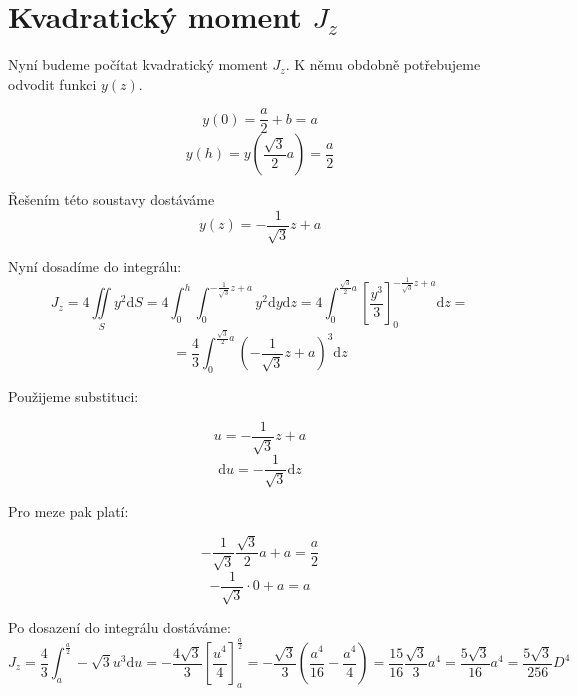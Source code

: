 \documentclass{article}
\begin{document}
\section{Kvadratický moment $J_z$}
Nyní budeme počítat kvadratický moment $J_z$. K němu obdobně potřebujeme odvodit funkci $y(z)$.

\[ y(0)=\frac{a}{2}+b = a\] 
\[ y(h)=y\left(\frac{\sqrt{3}}{2}a\right)=\frac{a}{2}\]

Řešením této soustavy dostáváme
\[ y(z)=-\frac{1}{\sqrt{3}}z+a \]

Nyní dosadíme do integrálu:
\[ J_z=4\iint\limits_{S} y^2\mathrm{d}S = 4\int_{0}^{h} \int_{0}^{-\frac{1}{\sqrt{3}}z+a} y^2 \mathrm{d}y \mathrm{d}z
= 4\int_{0}^{\frac{\sqrt{3}}{2}a} \left[\frac{y^3}{3}\right]_0^{-\frac{1}{\sqrt{3}}z+a}\mathrm{d}z =\]
\[= \frac{4}{3} \int_{0}^{\frac{\sqrt{3}}{2}a} \left(-\frac{1}{\sqrt{3}}z+a\right)^3 \mathrm{d}z\]

Použijeme substituci: 

\[u=-\frac{1}{\sqrt{3}}z+a\]  
\[\mathrm{d}u=-\frac{1}{\sqrt{3}}\mathrm{d}z\]

Pro meze pak platí:

\[-\frac{1}{\sqrt{3}}\frac{\sqrt{3}}{2}a + a = \frac{a}{2}\]
\[-\frac{1}{\sqrt{3}}\cdot 0 + a = a\]

Po dosazení do integrálu dostáváme:
\[ J_z = \frac{4}{3} \int_{a}^{\frac{a}{2}} -\sqrt{3} u^3 \mathrm{d}u = -\frac{4 \sqrt{3}}{3} \left[\frac{u^4}{4}\right]_{a}^{\frac{a}{2}} 
= -\frac{\sqrt{3}}{3} \left(\frac{a^4}{16}-\frac{a^4}{4}\right) = \frac{15}{16} \frac{\sqrt{3}}{3} a^4 = \frac{5 \sqrt{3}}{16}a^4
= \frac{5 \sqrt{3}}{256}D^4\]
\end{document}
